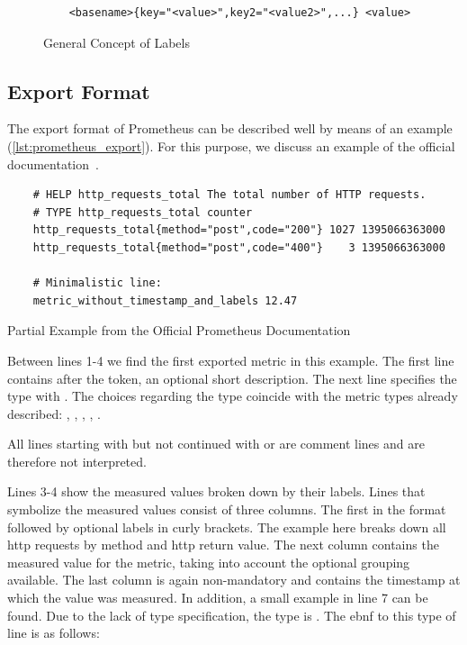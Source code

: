 \begin{figure}[!ht]
	\begin{verbatim}
	<basename>{key="<value>",key2="<value2>",...} <value>
	\end{verbatim}
	\caption{General Concept of Labels}
	\label{fig:concept_label}
\end{figure}

\subsection{Export Format}
\label{subsec:Exportformat}

The export format of Prometheus can be described well by means of an example (\cref{lst:prometheus_export}). For this purpose, we discuss an example of the official documentation~\cite{PrometheusExpositionFormatBeispiel}.

\begin{listing}[!ht]
	\begin{verbatim}
	# HELP http_requests_total The total number of HTTP requests.
	# TYPE http_requests_total counter
	http_requests_total{method="post",code="200"} 1027 1395066363000
	http_requests_total{method="post",code="400"}    3 1395066363000
	
	# Minimalistic line:
	metric_without_timestamp_and_labels 12.47
	\end{verbatim}
	\caption{Partial Example from the Official Prometheus Documentation~\cite{PrometheusExpositionFormatBeispiel}}
	\label{lst:prometheus_export}
\end{listing}

Between lines 1-4 we find the first exported metric in this example. The first line contains  after the token, an optional short description. The next line specifies the type with . The choices regarding the type coincide with the metric types already described: , , , , .

All lines starting with \promcode{#} but not continued with  or  are comment lines and are therefore not interpreted.

Lines 3-4 show the measured values broken down by their labels. Lines that symbolize the measured values consist of three columns. The first in the format  followed by optional labels in curly brackets. The example here breaks down all \gls{http} requests by method and \gls{http} return value. The next column contains the measured value for the metric, taking into account the optional grouping available. The last column is again non-mandatory and contains the timestamp at which the value was measured. 
In addition, a small example in line 7 can be found. Due to the lack of type specification, the type is . The \gls{ebnf} to this type of line is as follows:

